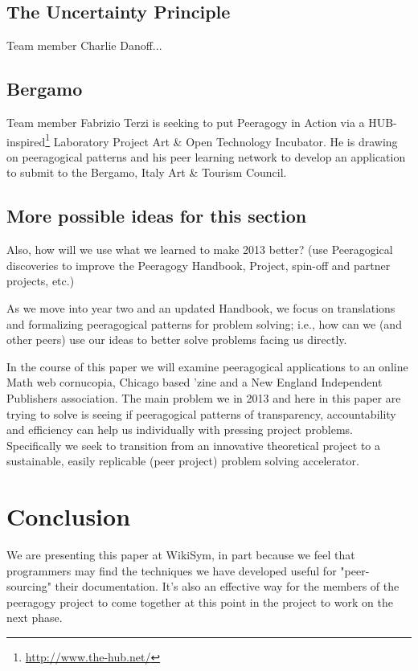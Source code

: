 \documentclass{acm_proc_article-sp}
\begin{document}
\subsection{The Uncertainty Principle}

Team member Charlie Danoff...

\subsection{Bergamo}

Team member Fabrizio Terzi is seeking to put Peeragogy in Action via a
HUB-inspired\footnote{\url{http://www.the-hub.net/}} Laboratory
Project Art \& Open Technology Incubator.  He is drawing on
peeragogical patterns and his peer learning network to develop an
application to submit to the Bergamo, Italy Art \& Tourism Council.

\subsection{More possible ideas for this section}

Also, how will we use what we learned to make 2013 better? (use
Peeragogical discoveries to improve the Peeragogy Handbook, Project,
spin-off and partner projects, etc.)

As we move into year two and an updated Handbook, we focus on translations and formalizing peeragogical patterns for problem solving; i.e., how can we (and other peers) use our ideas to better solve problems facing us directly.

In the course of this paper we will examine peeragogical applications to an online Math web cornucopia, Chicago based 'zine and a New England Independent Publishers association. The main problem we in 2013 and here in this paper are trying to solve is seeing if peeragogical patterns of transparency, accountability and efficiency can help us individually with pressing project problems. Specifically we seek to transition from an innovative theoretical project to a sustainable, easily replicable (peer project) problem solving accelerator.

%
%
%
%

\section{Conclusion}

We are presenting this paper at WikiSym, in part because we feel that programmers may find the techniques we have developed useful for "peer-sourcing" their documentation. It's also an effective way for the members of the peeragogy project to come together at this point in the project to work on the next phase.
\end{document}
